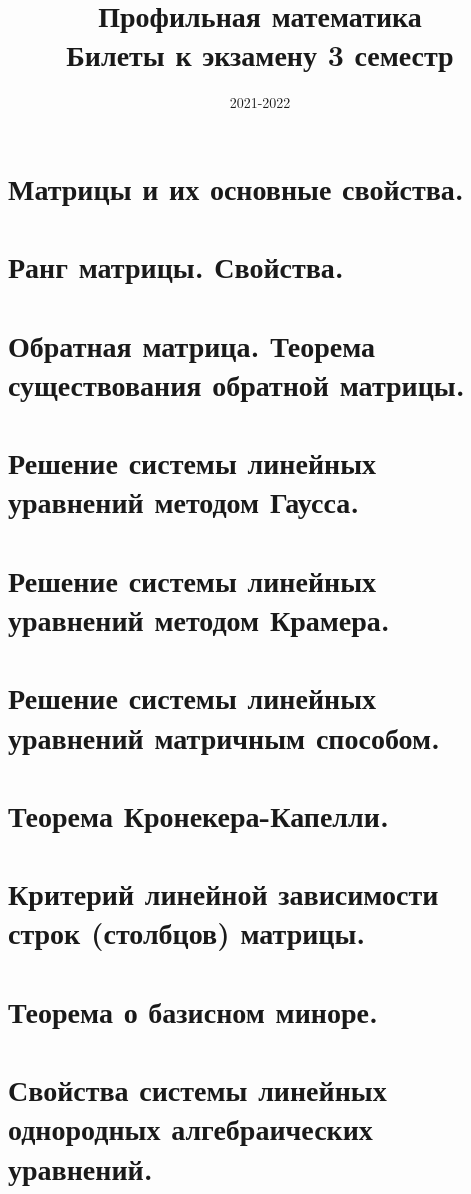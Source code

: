 \documentclass{article}
\title{Профильная математика\\ Билеты к экзамену 3 семестр}
\date{2021-2022}
\author{}
\begin{document}
\maketitle

\begin{sloppypar}
\tableofcontents

\newpage
\section{Матрицы и их основные свойства.}

\section{Ранг матрицы. Свойства.}

\section{Обратная матрица. Теорема существования обратной матрицы.}

\section{Решение системы линейных уравнений методом Гаусса.}

\section{Решение системы линейных уравнений методом Крамера.}

\section{Решение системы линейных уравнений матричным способом.}

\section{Теорема Кронекера-Капелли.}

\section{Критерий линейной зависимости строк (столбцов) матрицы.}

\section{Теорема о базисном миноре.}

\section{Свойства системы линейных однородных алгебраических уравнений.}


\end{sloppypar}
\end{document}
